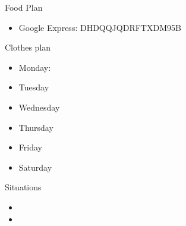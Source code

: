 \begin{columns}
    \begin{column}{0.20\linewidth}
      \begin{block}{Food Plan} 
        \begin{itemize}
          \tiny \item \tiny Google Express: DHDQQJQDRFTXDM95B
        \end{itemize}
      \end{block} 
      \begin{block}{Clothes plan} 
        \begin{itemize}
          \tiny \item \tiny Monday: 
        \item \tiny Tuesday
        \item \tiny Wednesday
        \item \tiny Thursday
        \item \tiny Friday
        \item \tiny Saturday
        \end{itemize} 
      \end{block} 
      
      \begin{block}{Situations}
        \begin{itemize}
          \tiny \item \tiny 
        \item \tiny 
        \end{itemize}
      \end{block}
    \end{column}
\end{columns}
\ifdefined\POSTER
